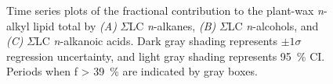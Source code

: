 \begin{figure}[p]
	\caption[Time-series plots of compound-class contribution]{Time series plots of the fractional contribution to the plant-wax \textit{n}-alkyl lipid total by \textit{(A)} $\Sigma$LC \textit{n}-alkanes, \textit{(B)} $\Sigma$LC \textit{n}-alcohols, and \textit{(C)} $\Sigma$LC \textit{n}-alkanoic acids. Dark gray shading represents $\pm 1 \sigma$ regression uncertainty, and light gray shading represents \SI{95}{\%} CI. Periods when f \SI{> 39}{\%} are indicated by gray boxes.}
	\label{Ch4Fig:9} 
\end{figure}

